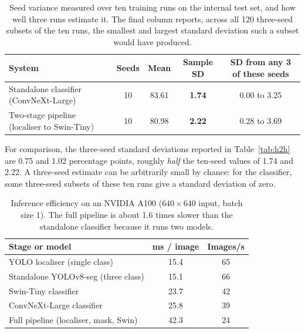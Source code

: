 \documentclass{melba}
\begin{document}
\begin{table}[t]
\centering
\caption{Seed variance measured over ten training runs on the internal test set, and how well three runs estimate it. The final column reports, across all 120 three-seed subsets of the ten runs, the smallest and largest standard deviation such a subset would have produced.}
\small
\begin{tabular}{|l|c|c|c|c|}
\hline
System & Seeds & Mean & Sample SD & SD from any 3 of these seeds \\
\hline
Standalone classifier (ConvNeXt-Large) & 10 & 83.61 & \textbf{1.74} & 0.00 to 3.25 \\
Two-stage pipeline (localiser to Swin-Tiny) & 10 & 80.98 & \textbf{2.22} & 0.28 to 3.69 \\
\hline
\end{tabular}

\vspace{2mm}
\parbox{0.95\textwidth}{\footnotesize For comparison, the three-seed standard deviations reported in Table~\ref{tab:h2h} are 0.75 and 1.02 percentage points, roughly \emph{half} the ten-seed values of 1.74 and 2.22. A three-seed estimate can be arbitrarily small by chance: for the classifier, some three-seed subsets of these ten runs give a standard deviation of zero.}
\label{tab:seeds}
\end{table}

\begin{table}[t]
\centering
\caption{Inference efficiency on an NVIDIA A100 ($640\times640$ input, batch size 1). The full pipeline is about 1.6 times slower than the standalone classifier because it runs two models.}
\footnotesize
\begin{tabular}{|l|c|c|}
\hline
Stage or model & ms / image & Images/s \\
\hline
YOLO localiser (single class) & 15.4 & 65 \\
Standalone YOLOv8-seg (three class) & 15.1 & 66 \\
Swin-Tiny classifier & 23.7 & 42 \\
ConvNeXt-Large classifier & 25.8 & 39 \\
Full pipeline (localiser, mask, Swin) & 42.3 & 24 \\
\hline
\end{tabular}
\label{tab:eff}
\end{table}
\end{document}
